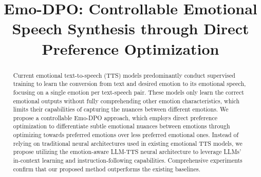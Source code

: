 \title{Emo-DPO: Controllable Emotional Speech Synthesis through Direct Preference Optimization}

\author{
\and
{}
\and
{}
\and
{}
\and
{}
}
\maketitle
\vspace{-0.5cm}
\begin{abstract}
Current emotional text-to-speech (TTS) models predominantly conduct supervised training to learn the conversion from text and desired emotion to its emotional speech, focusing on a single emotion per text-speech pair. These models only learn the correct emotional outputs without fully comprehending other emotion characteristics, which limits their capabilities of capturing the nuances between different emotions.
We propose a controllable Emo-DPO approach, which employs direct preference optimization to differentiate subtle emotional nuances between emotions through optimizing towards preferred emotions over less preferred emotional ones.
Instead of relying on traditional neural architectures used in existing emotional TTS models, we propose utilizing the emotion-aware LLM-TTS neural architecture to leverage LLMs' in-context learning and instruction-following capabilities. Comprehensive experiments confirm that our proposed method outperforms the existing baselines. 
\end{abstract}

